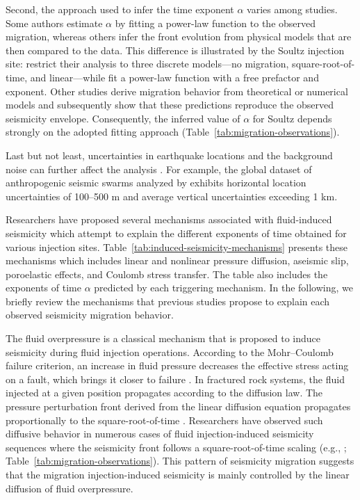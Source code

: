 \documentclass[draft]{agujournal2019}
\begin{document}
Second, the approach used to infer the time exponent $\alpha$ varies among studies. Some authors estimate $\alpha$ by fitting a power-law function to the observed migration, whereas others infer the front evolution from physical models that are then compared to the data. This difference is illustrated by the Soultz injection site:  restrict their analysis to three discrete models—no migration, square-root-of-time, and linear—while  fit a power-law function with a free prefactor and exponent. Other studies \cite{ShapiroEtAl2002, SaezUribe2023, DanreEtAl2024} derive migration behavior from theoretical or numerical models and subsequently show that these predictions reproduce the observed seismicity envelope. Consequently, the inferred value of $\alpha$ for Soultz depends strongly on the adopted fitting approach (Table~\ref{tab:migration-observations}).

Last but not least, uncertainties in earthquake locations and the background noise can further affect the analysis \cite{DeBarrosEtAl2021}. For example, the global dataset of anthropogenic seismic swarms analyzed by  exhibits horizontal location uncertainties of 100–500 m and average vertical uncertainties exceeding 1 km. 


Researchers have proposed several mechanisms associated with fluid-induced seismicity which attempt to explain the different exponents of time obtained for various injection sites. Table~\ref{tab:induced-seismicity-mechanisms} presents these mechanisms which includes linear and nonlinear pressure diffusion, aseismic slip, poroelastic effects, and Coulomb stress transfer. The table also includes the exponents of time $\alpha$ predicted by each triggering mechanism. In the following, we briefly review the mechanisms that previous studies propose to explain each observed seismicity migration behavior.


The fluid overpressure is a classical mechanism that is proposed to induce seismicity during fluid injection operations. According to the Mohr--Coulomb failure criterion, an increase in fluid pressure decreases the effective stress acting on a fault, which brings it closer to failure \cite{king1959role}. In fractured rock systems, the fluid injected at a given position propagates according to the diffusion law. The pressure perturbation front derived from the linear diffusion equation propagates proportionally to the square-root-of-time \cite{MurphyEtAl2004}. Researchers have observed such diffusive behavior in numerous cases of fluid injection-induced seismicity sequences where the seismicity front follows a square-root-of-time scaling (e.g., ; Table~\ref{tab:migration-observations}). This pattern of seismicity migration suggests that the migration injection-induced seismicity is mainly controlled by the linear diffusion of fluid overpressure.
\end{document}

